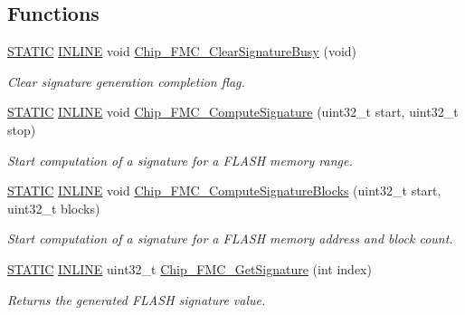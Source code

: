 \subsection*{Functions}
\begin{DoxyCompactItemize}
\item 
\hyperlink{group__LPC__Types__Public__Macros_ga10b2d890d871e1489bb02b7e70d9bdfb}{S\+T\+A\+T\+IC} \hyperlink{group__LPC__Types__Public__Types_ga2eb6f9e0395b47b8d5e3eeae4fe0c116}{I\+N\+L\+I\+NE} void \hyperlink{group__FMC__17XX__40XX_gab7ec5bd928d355795e7cd4f56371a9ec}{Chip\+\_\+\+F\+M\+C\+\_\+\+Clear\+Signature\+Busy} (void)
\begin{DoxyCompactList}\small\item\em Clear signature generation completion flag. \end{DoxyCompactList}\item 
\hyperlink{group__LPC__Types__Public__Macros_ga10b2d890d871e1489bb02b7e70d9bdfb}{S\+T\+A\+T\+IC} \hyperlink{group__LPC__Types__Public__Types_ga2eb6f9e0395b47b8d5e3eeae4fe0c116}{I\+N\+L\+I\+NE} void \hyperlink{group__FMC__17XX__40XX_ga12cde229d831a9e32208b038651ca228}{Chip\+\_\+\+F\+M\+C\+\_\+\+Compute\+Signature} (uint32\+\_\+t start, uint32\+\_\+t stop)
\begin{DoxyCompactList}\small\item\em Start computation of a signature for a F\+L\+A\+SH memory range. \end{DoxyCompactList}\item 
\hyperlink{group__LPC__Types__Public__Macros_ga10b2d890d871e1489bb02b7e70d9bdfb}{S\+T\+A\+T\+IC} \hyperlink{group__LPC__Types__Public__Types_ga2eb6f9e0395b47b8d5e3eeae4fe0c116}{I\+N\+L\+I\+NE} void \hyperlink{group__FMC__17XX__40XX_ga1341098e386d4291bf7ad3fb43b6d3bc}{Chip\+\_\+\+F\+M\+C\+\_\+\+Compute\+Signature\+Blocks} (uint32\+\_\+t start, uint32\+\_\+t blocks)
\begin{DoxyCompactList}\small\item\em Start computation of a signature for a F\+L\+A\+SH memory address and block count. \end{DoxyCompactList}\item 
\hyperlink{group__LPC__Types__Public__Macros_ga10b2d890d871e1489bb02b7e70d9bdfb}{S\+T\+A\+T\+IC} \hyperlink{group__LPC__Types__Public__Types_ga2eb6f9e0395b47b8d5e3eeae4fe0c116}{I\+N\+L\+I\+NE} uint32\+\_\+t \hyperlink{group__FMC__17XX__40XX_ga800317f87d55b213bdbd9aebe7c2a6b6}{Chip\+\_\+\+F\+M\+C\+\_\+\+Get\+Signature} (int index)
\begin{DoxyCompactList}\small\item\em Returns the generated F\+L\+A\+SH signature value. \end{DoxyCompactList}\item 

\end{DoxyCompactItemize}
